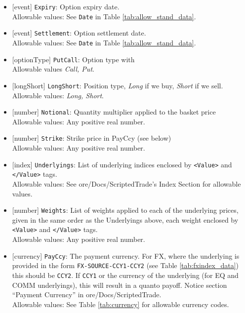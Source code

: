 \begin{itemize}
    \item{}[event] \lstinline!Expiry!: Option expiry date. \\
    Allowable values: See \lstinline!Date! in Table \ref{tab:allow_stand_data}.
    \item{}[event] \lstinline!Settlement!: Option settlement date. \\
    Allowable values: See \lstinline!Date! in Table \ref{tab:allow_stand_data}.
    \item{}[optionType] \lstinline!PutCall!: Option type with \\
          Allowable values \emph{Call, Put}.
    \item{}[longShort] \lstinline!LongShort!: Position type,
          {\em Long} if we buy, {\em Short} if we sell.\\
    Allowable values: \emph{Long, Short}.
        \item{}[number] \lstinline!Notional!: Quantity multiplier applied to the
          basket price \\
          Allowable values: Any positive real number.
        \item{}[number] \lstinline!Strike!: Strike price in PayCcy (see
          below) \\
          Allowable values: Any positive real number.
    \item{}[index] \lstinline!Underlyings!: List of underlying indices
          enclosed by {\tt <Value>} and {\tt </Value>} tags. \\
          Allowable values: See ore/Docs/ScriptedTrade's Index Section for allowable values.
    \item{}[number] \lstinline!Weights!: List of weights applied to each of
          the underlying prices, given in the same order as
          the Underlyings above, each weight enclosed by {\tt <Value>} and {\tt </Value>} tags.\\
          Allowable values: Any positive real number.
    \item{}[currency] \lstinline!PayCcy!: The payment currency. For FX, where the underlying is provided
      in the form \lstinline!FX-SOURCE-CCY1-CCY2! (see Table \ref{tab:fxindex_data}) this should
      be \lstinline!CCY2!. If \lstinline!CCY1! or the currency of the underlying (for EQ and
      COMM underlyings), this will result in a quanto payoff. Notice section ``Payment Currency'' in ore/Docs/ScriptedTrade. \\
        Allowable values: See Table \ref{tab:currency} for allowable currency codes.
\end{itemize}

